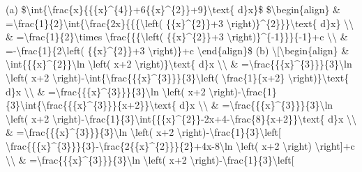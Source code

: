 \item {}

(a) \$\textbackslash int\{\textbackslash frac\{x\}\{\{\{x\}\textasciicircum\{4\}\}+6\{\{x\}\textasciicircum\{2\}\}+9\}\textbackslash text\{
d\}x\}\$ \$\textbackslash begin\{align\} \& =\textbackslash frac\{1\}\{2\}\textbackslash int\{\textbackslash frac\{2x\}\{\{\{\textbackslash left(
\{\{x\}\textasciicircum\{2\}\}+3 \textbackslash right)\}\textasciicircum\{2\}\}\}\textbackslash text\{
d\}x\} \textbackslash\textbackslash{} \& =\textbackslash frac\{1\}\{2\}\textbackslash times
\textbackslash frac\{\{\{\textbackslash left( \{\{x\}\textasciicircum\{2\}\}+3
\textbackslash right)\}\textasciicircum\{-1\}\}\}\{-1\}+c \textbackslash\textbackslash{}
\& =-\textbackslash frac\{1\}\{2\textbackslash left( \{\{x\}\textasciicircum\{2\}\}+3
\textbackslash right)\}+c \textbackslash end\{align\}\$ (b) \textbackslash{[}\textbackslash begin\{align\}
\& \textbackslash int\{\{\{x\}\textasciicircum\{2\}\}\textbackslash ln
\textbackslash left( x+2 \textbackslash right)\}\textbackslash text\{
d\}x \textbackslash\textbackslash{} \& =\textbackslash frac\{\{\{x\}\textasciicircum\{3\}\}\}\{3\}\textbackslash ln
\textbackslash left( x+2 \textbackslash right)-\textbackslash int\{\textbackslash frac\{\{\{x\}\textasciicircum\{3\}\}\}\{3\}\textbackslash left(
\textbackslash frac\{1\}\{x+2\} \textbackslash right)\}\textbackslash text\{
d\}x \textbackslash\textbackslash{} \& =\textbackslash frac\{\{\{x\}\textasciicircum\{3\}\}\}\{3\}\textbackslash ln
\textbackslash left( x+2 \textbackslash right)-\textbackslash frac\{1\}\{3\}\textbackslash int\{\textbackslash frac\{\{\{x\}\textasciicircum\{3\}\}\}\{x+2\}\}\textbackslash text\{
d\}x \textbackslash\textbackslash{} \& =\textbackslash frac\{\{\{x\}\textasciicircum\{3\}\}\}\{3\}\textbackslash ln
\textbackslash left( x+2 \textbackslash right)-\textbackslash frac\{1\}\{3\}\textbackslash int\{\{\{x\}\textasciicircum\{2\}\}-2x+4-\textbackslash frac\{8\}\{x+2\}\}\textbackslash text\{
d\}x \textbackslash\textbackslash{} \& =\textbackslash frac\{\{\{x\}\textasciicircum\{3\}\}\}\{3\}\textbackslash ln
\textbackslash left( x+2 \textbackslash right)-\textbackslash frac\{1\}\{3\}\textbackslash left{[}
\textbackslash frac\{\{\{x\}\textasciicircum\{3\}\}\}\{3\}-\textbackslash frac\{2\{\{x\}\textasciicircum\{2\}\}\}\{2\}+4x-8\textbackslash ln
\textbackslash left( x+2 \textbackslash right) \textbackslash right{]}+c
\textbackslash\textbackslash{} \& =\textbackslash frac\{\{\{x\}\textasciicircum\{3\}\}\}\{3\}\textbackslash ln
\textbackslash left( x+2 \textbackslash right)-\textbackslash frac\{1\}\{3\}\textbackslash left{[}
